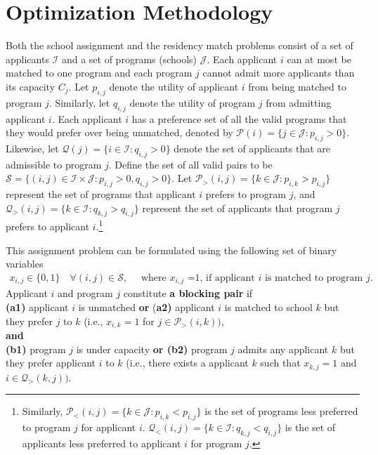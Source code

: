 \documentclass[11pt]{article}
\begin{document}
\section{Optimization Methodology}
Both the school assignment and the residency match problems consist of a set of applicants $\mathcal{I}$ and a set of programs (schools) $\mathcal{J}$. Each applicant $i$ can at most be matched to one program and each program $j$ cannot admit more applicants than its capacity $C_j$.
Let $p_{i,j}$ denote the utility of applicant $i$ from being matched to program $j$. Similarly, let $q_{i,j}$ denote the utility of program $j$ from admitting applicant $i$.
Each applicant $i$ has a preference set of all the valid programs that they would prefer over being unmatched, denoted by $\mathcal{P}(i) = \{j \in \mathcal{J}: p_{i,j} > 0 \}$. Likewise, let $\mathcal{Q}(j) = \{i \in \mathcal{I}: q_{i,j} > 0 \}$ denote the set of applicants that are admissible to program $j$. Define the set of all valid pairs to be $\mathcal{S} = \{(i,j) \in \mathcal{I} \times \mathcal{J}: p_{i,j} > 0, q_{i,j} > 0\}$.
Let $\mathcal P_>(i,j) = \{k \in \mathcal{J}: p_{i,k} > p_{i,j}\}$ represent the set of programs that applicant $i$ prefers to program $j$, and $\mathcal Q_>(i,j) = \{k \in \mathcal{I}: q_{k,j} > q_{i,j}\}$ represent the set of applicants that program $j$ prefers to applicant $i$.\footnote{Similarly, $\mathcal P_<(i,j) = \{k \in \mathcal{J}: p_{i,k} < p_{i,j}\}$ is the set of programs less preferred to program $j$ for applicant $i$. $\mathcal Q_<(i,j) = \{k \in \mathcal{I}: q_{k,j} < q_{i,j}\}$ is the set of applicants less preferred to applicant $i$ for program $j$. }

This assignment problem can be formulated using the following set of binary variables 
\begin{align*}
    x_{i,j} \in  \{0,1\}  \quad \forall (i,j) \in \mathcal{S}, \quad \text{ where $x_{i,j}$ =1, if applicant $i$ is matched to program } j.
\end{align*}
Applicant $i$ and program $j$ constitute {\bf  a blocking pair} if \\
{\bf  (a1)} applicant $i$ is unmatched {\bf  or} ({\bf  a2)} applicant $i$ is matched to school $k$ but they prefer $j$ to $k$ (i.e.,  $x_{i,k} = 1$ for $j \in \mathcal{P}_>(i,k))$,\\
 {\bf  and}\\
  {\bf  (b1)} program $j$ is under capacity {\bf  or (b2)} program $j$ admits any applicant $k$ but they prefer applicant $i$ to $k$ (i.e.,  there exists a applicant $k$ such that $x_{k,j} = 1$ and $i \in \mathcal{Q}_>(k,j) )$. 
\end{document}
